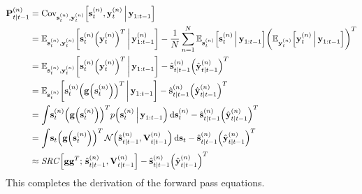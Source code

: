 		\begin{align}
			\boldsymbol{\mathrm{P}}_{t \vert t - 1}^{(n)}
				&= \operatorname{Cov}_{\boldsymbol{\mathrm{s}}_t^{(n)}, \boldsymbol{\mathrm{y}}_t^{(n)}}\!\Big[\boldsymbol{\mathrm{s}}_t^{(n)}, \boldsymbol{\mathrm{y}}_t^{(n)} \,\Big\vert\, \boldsymbol{\mathrm{y}}_{1:t - 1}\Big]  \nonumber \\
				&= \mathbb{E}_{\boldsymbol{\mathrm{s}}_t^{(n)}, \boldsymbol{\mathrm{y}}_t^{(n)}}\bigg[\boldsymbol{\mathrm{s}}_t^{(n)} \Big(\boldsymbol{\mathrm{y}}_t^{(n)}\Big)^T \,\bigg\vert\, \boldsymbol{\mathrm{y}}_{1:t - 1}^{(n)}\bigg] - \frac{1}{N} \sum_{n = 1}^{N} \mathbb{E}_{\boldsymbol{\mathrm{s}}_t^{(n)}}\Big[\boldsymbol{\mathrm{s}}_t^{(n)} \,\Big\vert\, \boldsymbol{\mathrm{y}}_{1:t - 1}\Big] \bigg(\mathbb{E}_{\boldsymbol{\mathrm{y}}_t^{(n)}}\Big[\boldsymbol{\mathrm{y}}_t^{(n)} \,\Big\vert\, \boldsymbol{\mathrm{y}}_{1:t - 1}\Big]\bigg)^T  \nonumber \\
				&= \mathbb{E}_{\boldsymbol{\mathrm{s}}_t^{(n)}, \boldsymbol{\mathrm{y}}_t^{(n)}}\bigg[\boldsymbol{\mathrm{s}}_t^{(n)} \Big(\boldsymbol{\mathrm{y}}_t^{(n)}\Big)^T \,\bigg\vert\, \boldsymbol{\mathrm{y}}_{1:t - 1}\bigg] - \hat{\boldsymbol{\mathrm{s}}}_{t \vert t - 1}^{(n)} \Big(\hat{\boldsymbol{\mathrm{y}}}_{t \vert t - 1}^{(n)}\Big)^T  \nonumber \\
				&= \mathbb{E}_{\boldsymbol{\mathrm{s}}_t^{(n)}}\bigg[\boldsymbol{\mathrm{s}}_t^{(n)} \Big(\boldsymbol{\mathrm{g}}\Big(\boldsymbol{\mathrm{s}}_t^{(n)}\Big)\Big)^T \,\bigg\vert\, \boldsymbol{\mathrm{y}}_{1:t - 1}\bigg] - \hat{\boldsymbol{\mathrm{s}}}_{t \vert t - 1}^{(n)} \Big(\hat{\boldsymbol{\mathrm{y}}}_{t \vert t - 1}^{(n)}\Big)^T  \nonumber \\
				&= \int\! \boldsymbol{\mathrm{s}}_t^{(n)} \Big(\boldsymbol{\mathrm{g}}\Big(\boldsymbol{\mathrm{s}}_t^{(n)}\Big)\Big)^T p\Big(\boldsymbol{\mathrm{s}}_t^{(n)} \,\Big\vert\, \boldsymbol{\mathrm{y}}_{1:t - 1}\Big) \dd{\boldsymbol{\mathrm{s}}_t^{(n)}} - \hat{\boldsymbol{\mathrm{s}}}_{t \vert t - 1}^{(n)} \Big(\hat{\boldsymbol{\mathrm{y}}}_{t \vert t - 1}^{(n)}\Big)^T  \nonumber \\
				&= \int\! \boldsymbol{\mathrm{s}}_t \Big(\boldsymbol{\mathrm{g}}\Big(\boldsymbol{\mathrm{s}}_t^{(n)}\Big)\Big)^T \,\mathcal{N}\Big(\hat{\boldsymbol{\mathrm{s}}}_{t \vert t - 1}^{(n)}, \boldsymbol{\mathrm{V}}_{t \vert t - 1}^{(n)}\Big) \dd{\boldsymbol{\mathrm{s}}_t} - \hat{\boldsymbol{\mathrm{s}}}_{t \vert t - 1}^{(n)} \Big(\hat{\boldsymbol{\mathrm{y}}}_{t \vert t - 1}^{(n)}\Big)^T  \nonumber \\
				&\approx \mathit{SRC}\Big[ \boldsymbol{\mathrm{g}} \boldsymbol{\mathrm{g}}^T;\, \hat{\boldsymbol{\mathrm{s}}}_{t \vert t - 1}^{(n)}, \boldsymbol{\mathrm{V}}_{t \vert t - 1}^{(n)} \Big] - \hat{\boldsymbol{\mathrm{s}}}_{t \vert t - 1}^{(n)} \Big(\hat{\boldsymbol{\mathrm{y}}}_{t \vert t - 1}^{(n)}\Big)^T  \label{eq:cubatureK}
		\end{align}
		This completes the derivation of the forward pass equations.

